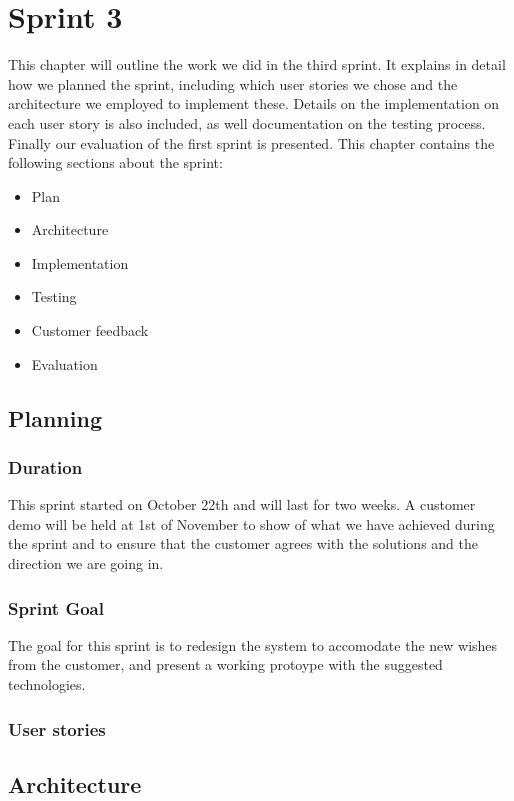 \chapter{Sprint 3}
This chapter will outline the work we did in the third sprint. It explains in detail how we planned the sprint, including which user stories we chose and the architecture we employed to implement these. Details on the implementation on each user story is also included, as well documentation on the testing process. Finally our evaluation of the first sprint is presented. This chapter contains the following sections about the sprint:
\begin{itemize}
\item Plan
\item Architecture
\item Implementation
\item Testing
\item Customer feedback
\item Evaluation
\end{itemize}


\section{Planning}

\subsection{Duration}
This sprint started on October 22th and will last for two weeks. A customer demo will be held at 1st of November to show of what we have achieved during the sprint and to ensure that the customer agrees with the solutions and the direction we are going in.

\subsection{Sprint Goal}
The goal for this sprint is to redesign the system to accomodate the new wishes from the customer, and present a working protoype with the suggested technologies.

\subsection{User stories}

\section{Architecture}
